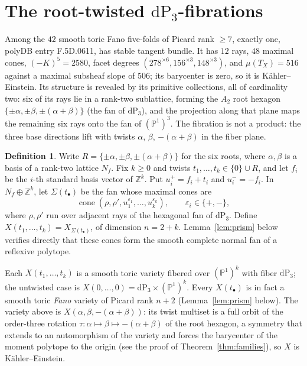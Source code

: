 \documentclass[11pt]{amsart}
\theoremstyle{definition}
\newtheorem{definition}[theorem]{Definition}
\theoremstyle{remark}
\newcommand{\PP}{\mathbb{P}}
\newcommand{\ZZ}{\mathbb{Z}}
\newcommand{\dP}{\mathrm{dP}}
\begin{document}
\section{The root-twisted \texorpdfstring{$\dP_3$}{dP3}-fibrations}
\label{sec:roottwist}

Among the $42$ smooth toric Fano five-folds of Picard rank $\ge 7$,
exactly one, polyDB entry \textsf{F.5D.0611}, has stable tangent
bundle. It has $12$ rays, $48$
maximal cones, $(-K)^5 = 2580$, facet degrees
$(278^{\times 6}, 156^{\times 3}, 148^{\times 3})$, and
$\mu(T_X) = 516$ against a maximal subsheaf slope of $506$; its
barycenter is zero, so it is K\"ahler--Einstein. Its structure is revealed by its
primitive collections, all of cardinality two: six of its rays lie in a
rank-two sublattice, forming the $A_2$ root hexagon
$\{\pm\alpha, \pm\beta, \pm(\alpha+\beta)\}$ (the fan of $\dP_3$),
and the projection along that plane maps the remaining six rays onto the
fan of $(\PP^1)^3$. The fibration is not a product: the three base
directions lift with twists $\alpha$, $\beta$, $-(\alpha+\beta)$ in the
fiber plane.

\begin{definition}\label{def:roottwist}
Write $R = \{\pm\alpha, \pm\beta, \pm(\alpha{+}\beta)\}$ for the six
roots, where $\alpha, \beta$ is a basis of a rank-two lattice $N_f$.
Fix $k \ge 0$ and twists $t_1, \dots, t_k \in \{0\} \cup R$, and let
$f_i$ be the $i$-th standard basis vector of $\ZZ^k$. Put
$u_i^+=f_i+t_i$ and $u_i^-=-f_i$. In $N_f\oplus\ZZ^k$, let
$\Sigma(t_\bullet)$ be the fan whose maximal cones are
\[
\operatorname{cone}(\rho,\rho',u_1^{\varepsilon_1},\dots,
u_k^{\varepsilon_k}),
\qquad \varepsilon_i\in\{+,-\},
\]
where $\rho,\rho'$ run over adjacent rays of the hexagonal fan of $\dP_3$.
Define $X(t_1,\dots,t_k)=X_{\Sigma(t_\bullet)}$, of dimension $n=2+k$.
Lemma~\ref{lem:prism} below verifies directly that these cones form the
smooth complete normal fan of a reflexive polytope.
\end{definition}

Each $X(t_1,\dots,t_k)$ is a smooth toric variety fibered over
$(\PP^1)^k$ with fiber $\dP_3$; the untwisted case is
$X(0,\dots,0) = \dP_3 \times (\PP^1)^k$. Every $X(t_\bullet)$ is in fact a
smooth toric \emph{Fano} variety of Picard rank $n + 2$
(Lemma~\ref{lem:prism} below). The variety above is
$X(\alpha, \beta, -(\alpha+\beta))$: its twist multiset is a full orbit of
the order-three rotation $\tau\colon \alpha \mapsto \beta \mapsto
-(\alpha+\beta)$ of the root hexagon, a symmetry that extends to an
automorphism of the variety and forces the barycenter of the moment
polytope to the origin (see the proof of Theorem~\ref{thm:families}), so
$X$ is K\"ahler--Einstein.
\end{document}
